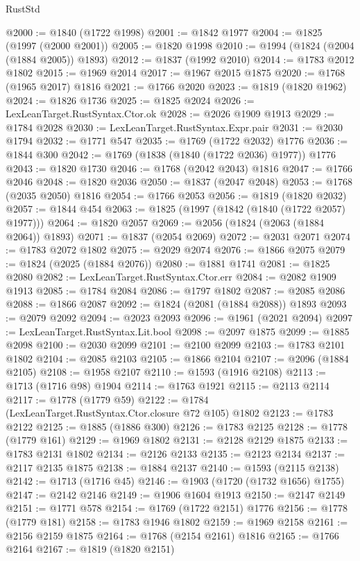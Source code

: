 \begin{lexlean}{RustStd}
\begin{coremodule}
{\begin{coremodule}
{{{{{{{{{{{{{{{{{{{{{{{{{{{{{{{{{{{{{{{{{{{{{{{@2000 := @1840 (@1722 @1998)
@2001 := @1842 @1977
@2004 := @1825 (@1997 (@2000 @2001))
@2005 := @1820 @1998
@2010 := @1994 (@1824 (@2004 (@1884 @2005)) @1893)
@2012 := @1837 (@1992 @2010)
@2014 := @1783 @2012 @1802
@2015 := @1969 @2014
@2017 := @1967 @2015 @1875
@2020 := @1768 (@1965 @2017) @1816
@2021 := @1766 @2020
@2023 := @1819 (@1820 @1962)
@2024 := @1826 @1736
@2025 := @1825 @2024
@2026 := LexLeanTarget.RustSyntax.Ctor.ok
@2028 := @2026 @1909 @1913
@2029 := @1784 @2028
@2030 := LexLeanTarget.RustSyntax.Expr.pair
@2031 := @2030 @1794
@2032 := @1771 @547
@2035 := @1769 (@1722 @2032) @1776
@2036 := @1844 @300
@2042 := @1769 (@1838 (@1840 (@1722 @2036) @1977)) @1776
@2043 := @1820 @1730
@2046 := @1768 (@2042 @2043) @1816
@2047 := @1766 @2046
@2048 := @1820 @2036
@2050 := @1837 (@2047 @2048)
@2053 := @1768 (@2035 @2050) @1816
@2054 := @1766 @2053
@2056 := @1819 (@1820 @2032)
@2057 := @1844 @454
@2063 := @1825 (@1997 (@1842 (@1840 (@1722 @2057) @1977)))
@2064 := @1820 @2057
@2069 := @2056 (@1824 (@2063 (@1884 @2064)) @1893)
@2071 := @1837 (@2054 @2069)
@2072 := @2031 @2071
@2074 := @1783 @2072 @1802
@2075 := @2029 @2074
@2076 := @1866 @2075
@2079 := @1824 (@2025 (@1884 @2076))
@2080 := @1881 @1741
@2081 := @1825 @2080
@2082 := LexLeanTarget.RustSyntax.Ctor.err
@2084 := @2082 @1909 @1913
@2085 := @1784 @2084
@2086 := @1797 @1802
@2087 := @2085 @2086
@2088 := @1866 @2087
@2092 := @1824 (@2081 (@1884 @2088)) @1893
@2093 := @2079 @2092
@2094 := @2023 @2093
@2096 := @1961 (@2021 @2094)
@2097 := LexLeanTarget.RustSyntax.Lit.bool
@2098 := @2097 @1875
@2099 := @1885 @2098
@2100 := @2030 @2099
@2101 := @2100 @2099
@2103 := @1783 @2101 @1802
@2104 := @2085 @2103
@2105 := @1866 @2104
@2107 := @2096 (@1884 @2105)
@2108 := @1958 @2107
@2110 := @1593 (@1916 @2108)
@2113 := @1713 (@1716 @98) @1904
@2114 := @1763 @1921
@2115 := @2113 @2114
@2117 := @1778 (@1779 @59)
@2122 := @1784 (LexLeanTarget.RustSyntax.Ctor.closure @72 @105) @1802
@2123 := @1783 @2122
@2125 := @1885 (@1886 @300)
@2126 := @1783 @2125
@2128 := @1778 (@1779 @161)
@2129 := @1969 @1802
@2131 := @2128 @2129 @1875
@2133 := @1783 @2131 @1802
@2134 := @2126 @2133
@2135 := @2123 @2134
@2137 := @2117 @2135 @1875
@2138 := @1884 @2137
@2140 := @1593 (@2115 @2138)
@2142 := @1713 (@1716 @45)
@2146 := @1903 (@1720 (@1732 @1656) @1755)
@2147 := @2142 @2146
@2149 := @1906 @1604 @1913
@2150 := @2147 @2149
@2151 := @1771 @578
@2154 := @1769 (@1722 @2151) @1776
@2156 := @1778 (@1779 @181)
@2158 := @1783 @1946 @1802
@2159 := @1969 @2158
@2161 := @2156 @2159 @1875
@2164 := @1768 (@2154 @2161) @1816
@2165 := @1766 @2164
@2167 := @1819 (@1820 @2151)
}}}}}}}}}}}}}}}}}}}}}}}}}}}}}}}}}}}}}}}}}}}}}}}
\end{coremodule}}
\end{coremodule}
\end{lexlean}

